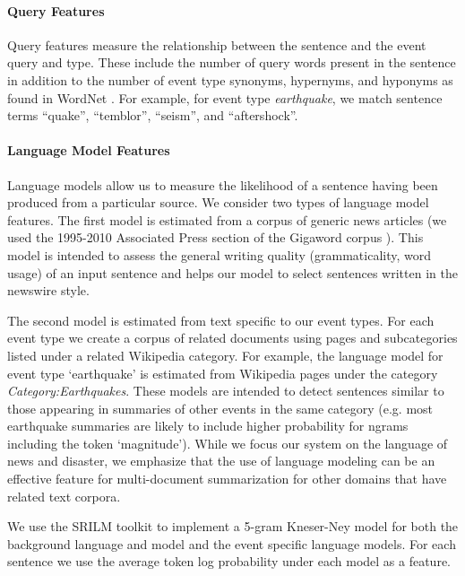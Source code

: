 \paragraph{Query Features}

Query features measure the relationship between the sentence and the event query and type.  These include the number of query words present in the sentence in addition to the number of event type synonyms, hypernyms, and hyponyms as found in WordNet \cite{miller1995wordnet}.  
For example, for event type \emph{earthquake},  we match sentence terms 
``quake'', ``temblor'', ``seism'', and ``aftershock''.

\paragraph{Language Model Features}\label{subsubsec:lm}
Language models allow us to measure the likelihood of a sentence having been 
produced from a particular source.  We consider two types of language model 
features.  The first model is estimated from a corpus of generic news 
articles (we used the 1995-2010 Associated Press section of the 
Gigaword corpus \cite{graff2003english}).  
This model is intended to assess the general writing quality (grammaticality, word usage) of an input sentence and helps our model to select sentences
written in the newswire style.  

The second model is estimated from text specific to our event types.  
For each event type we create a corpus of related documents using pages
and subcategories listed under a related Wikipedia category.
For example, the language model for event type `earthquake' is estimated 
from Wikipedia pages under the category \emph{Category:Earthquakes}.  
These models are intended to detect sentences similar to those appearing in 
summaries of other events in the same category 
(e.g. most earthquake summaries are likely to include higher probability for 
ngrams including the token `magnitude'). While we focus our system on the 
language of news and disaster, we emphasize that the use of language modeling 
can be an effective feature for multi-document summarization for other 
domains that have related text corpora.




We use the SRILM toolkit \cite{stolcke2002srilm} to implement a 5-gram Kneser-Ney model for both
the background language and model and the event specific language models.
For each sentence we use the average token log probability under each model
as a feature.


